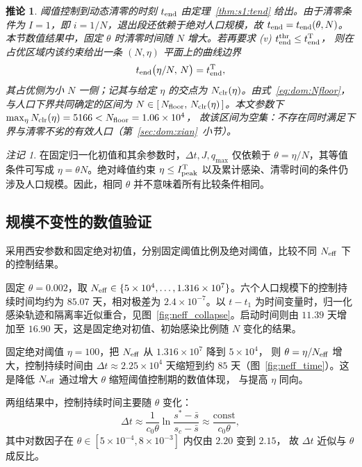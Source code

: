 \documentclass[UTF8,a4paper,10pt,fontset=fandol]{ctexart}
\theoremstyle{cnplain}
\newtheorem{corollaryn}[theorem]{推论}
\theoremstyle{remark}
\newtheorem{remarkn}[theorem]{注记}
\numberwithin{equation}{section}
\begin{document}
\begin{corollaryn}\label{cor:clr}
阈值控制到动态清零的时刻 $t_{\rm end}$ 由定理~\ref{thm:s1:tend} 给出。由于清零条件为 $I=1$，即 $i=1/N$，退出段还依赖于绝对人口规模，故 $t_{\rm end}=t_{\rm end}(\theta,N)$。本节数值结果中，固定 $\theta$ 时清零时间随 $N$ 增大。若再要求
(v) $t_{\rm end}^{\rm thr}\le t_{\rm end}^{\rm T}$，
则在占优区域内该约束给出一条 $(N,\eta)$ 平面上的曲线边界
\begin{equation}
  t_{\rm end}\big(\eta/N,\,N\big)=t_{\rm end}^{\rm T},
  \label{eq:dom:clrarc}
\end{equation}
其占优侧为小 $N$ 一侧；记其与给定 $\eta$ 的交点为 $N_{\rm clr}(\eta)$。由式~\eqref{eq:dom:Nfloor}，
与人口下界共同确定的区间为 $N\in[\,N_{\rm floor},\,N_{\rm clr}(\eta)\,]$。本文参数下
$\max_\eta N_{\rm clr}(\eta)=5166<N_{\rm floor}=1.06\times10^{4}$，
故该区间为空集：不存在同时满足下界与清零不劣的有效人口（第~\ref{sec:dom:xian}~小节）。
\end{corollaryn}

\begin{remarkn}\label{rem:dom:dichotomy}
在固定归一化初值和其余参数时，$\Delta t,J,q_{\max}$ 仅依赖于 $\theta=\eta/N$，其等值条件可写成 $\eta=\theta N$。绝对峰值约束 $\eta\le I_{\rm peak}^{\rm T}$ 以及累计感染、清零时间的条件仍涉及人口规模。因此，相同 $\theta$ 并不意味着所有比较条件相同。
\end{remarkn}

\subsection{规模不变性的数值验证}
\label{sec:scaling}

采用西安参数和固定绝对初值，分别固定阈值比例及绝对阈值，比较不同 $N_{\rm eff}$ 下的控制结果。

固定 $\theta=0.002$，取 $N_{\rm eff}\in\{5\times10^4,\dots,1.316\times10^7\}$。六个人口规模下的控制持续时间均约为 $85.07$ 天，相对极差为 $2.4\times10^{-7}$。以 $t-t_1$ 为时间变量时，归一化感染轨迹和隔离率近似重合，见图~\ref{fig:neff_collapse}。启动时间则由 $11.39$ 天增加至 $16.90$ 天，这是固定绝对初值、初始感染比例随 $N$ 变化的结果。

固定绝对阈值 $\eta=100$，把 $N_{\rm eff}$ 从 $1.316\times10^7$ 降到 $5\times10^{4}$，
则 $\theta=\eta/N_{\rm eff}$ 增大，控制持续时间由 $\Delta t\approx2.25\times10^4$ 天缩短到约
$85$ 天（图~\ref{fig:neff_time}）。这是降低 $N_{\rm eff}$ 通过增大 $\theta$ 缩短阈值控制期的数值体现，
与提高 $\eta$ 同向。

两组结果中，控制持续时间主要随 $\theta$ 变化：
\[
\Delta t\approx\frac{1}{c_0\theta}\ln\frac{s^*-\bar s}{s_c-\bar s}\approx\frac{\text{const}}{c_0\theta},
\]
其中对数因子在 $\theta\in[5\times10^{-4},8\times10^{-3}]$ 内仅由 $2.20$ 变到 $2.15$，
故 $\Delta t$ 近似与 $\theta$ 成反比。
\end{document}
